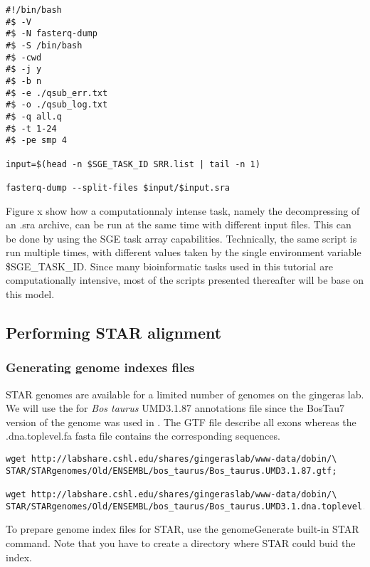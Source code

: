 \begin{verbatim}
#!/bin/bash
#$ -V
#$ -N fasterq-dump
#$ -S /bin/bash
#$ -cwd
#$ -j y
#$ -b n
#$ -e ./qsub_err.txt
#$ -o ./qsub_log.txt
#$ -q all.q
#$ -t 1-24
#$ -pe smp 4

input=$(head -n $SGE_TASK_ID SRR.list | tail -n 1)

fasterq-dump --split-files $input/$input.sra
\end{verbatim}


Figure x show how a computationnaly intense task, namely the decompressing of an .sra archive, can be run at the same time with different input files. This can be done by using the SGE task array capabilities. Technically, the same script is run multiple times, with different values taken by the single environment variable \$SGE\_TASK\_ID. Since many bioinformatic tasks used in this tutorial are computationally intensive, most of the scripts presented thereafter will be base on this model.







 

\subsection{Performing STAR alignment}

\subsubsection{Generating genome indexes files}

STAR genomes are available for a limited number of genomes on the gingeras lab. We will use the for \textit{Bos taurus}  UMD3.1.87 annotations file since the BosTau7 version of the genome was used in \cite{Ariel2021}. The GTF file describe all exons whereas the .dna.toplevel.fa fasta file contains the corresponding sequences.



\begin{verbatim}
wget http://labshare.cshl.edu/shares/gingeraslab/www-data/dobin/\
STAR/STARgenomes/Old/ENSEMBL/bos_taurus/Bos_taurus.UMD3.1.87.gtf;

wget http://labshare.cshl.edu/shares/gingeraslab/www-data/dobin/\
STAR/STARgenomes/Old/ENSEMBL/bos_taurus/Bos_taurus.UMD3.1.dna.toplevel.fa;
\end{verbatim}

To prepare genome index files for STAR, use the genomeGenerate built-in STAR command.
Note that you have to create a directory where STAR could buid the index.

